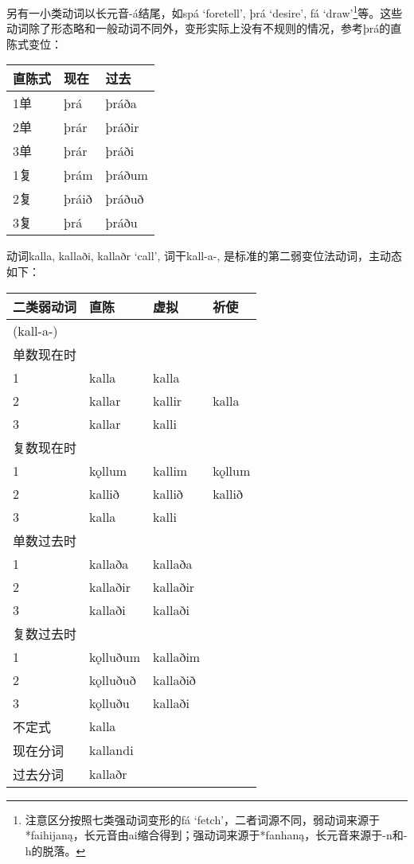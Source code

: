 另有一小类动词以长元音-á结尾，如spá `foretell', þrá `desire', fá
`draw'\footnote{注意区分按照七类强动词变形的fá
  `fetch'，二者词源不同，弱动词来源于*faihijaną，长元音由ai缩合得到；强动词来源于*fanhaną，长元音来源于-n和-h的脱落。}等。这些动词除了形态略和一般动词不同外，变形实际上没有不规则的情况，参考þrá的直陈式变位：

\begin{longtable}{lll}
  \toprule
  直陈式 & 现在    & 过去     \\
  \midrule
  \endhead
  \bottomrule
  \endfoot
  1单  & þrá   & þráða  \\
  2单  & þrár  & þráðir \\
  3单  & þrár  & þráði  \\
  1复  & þrám  & þráðum \\
  2复  & þráið & þráðuð \\
  3复  & þrá   & þráðu  \\
\end{longtable}

动词kalla, kallaði, kallaðr `call‌', 词干kall-a-,
是标准的第二弱变位法动词，主动态如下：

\begin{longtable}{llll}
  \toprule
  二类弱动词     & 直陈       & 虚拟       & 祈使     \\
  \midrule
  \endhead
  \bottomrule
  \endfoot
  (kall-a-) &          &          &        \\
  单数现在时     &          &          &        \\
  1         & kalla    & kalla    &        \\
  2         & kallar   & kallir   & kalla  \\
  3         & kallar   & kalli    &        \\
  复数现在时     &          &          &        \\
  1         & kǫllum   & kallim   & kǫllum \\
  2         & kallið   & kallið   & kallið \\
  3         & kalla    & kalli    &        \\
  单数过去时     &          &          &        \\
  1         & kallaða  & kallaða  &        \\
  2         & kallaðir & kallaðir &        \\
  3         & kallaði  & kallaði  &        \\
  复数过去时     &          &          &        \\
  1         & kǫlluðum & kallaðim &        \\
  2         & kǫlluðuð & kallaðið &        \\
  3         & kǫlluðu  & kallaði  &        \\
  不定式       & kalla    &          &        \\
  现在分词      & kallandi &          &        \\
  过去分词      & kallaðr  &          &        \\
\end{longtable}

